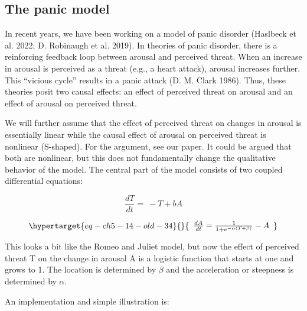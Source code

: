 \documentclass[
  letterpaper,
]{scrbook}
\begin{document}
\hypertarget{the-panic-model}{%
\subsection{The panic model}\label{the-panic-model}}

In recent years, we have been working on a model of panic disorder
(Haslbeck et al. 2022; D. Robinaugh et al. 2019). In theories of panic
disorder, there is a reinforcing feedback loop between arousal and
perceived threat. When an increase in arousal is perceived as a threat
(e.g., a heart attack), arousal increases further. This ``vicious
cycle'' results in a panic attack (D. M. Clark 1986). Thus, these
theories posit two causal effects: an effect of perceived threat on
arousal and an effect of arousal on perceived threat.

We will further assume that the effect of perceived threat on changes in
arousal is essentially linear while the causal effect of arousal on
perceived threat is nonlinear (S-shaped). For the argument, see our
paper. It could be argued that both are nonlinear, but this does not
fundamentally change the qualitative behavior of the model. The central
part of the model consists of two coupled differential equations:

\[\frac{dT}{dt} = \  - T + bA\]

\begin{equation}\protect\hypertarget{eq-ch5-14-old-34}{}{\begin{array}{r}
\frac{dA}{dt} = \frac{1}{1 + e^{- \alpha(T + \beta)}} - A
\end{array}}\label{eq-ch5-14-old-34}\end{equation}

This looks a bit like the Romeo and Juliet model, but now the effect of
perceived threat T on the change in arousal A is a logistic function
that starts at one and grows to 1. The location is determined by
\(\beta\) and the acceleration or steepness is determined by \(\alpha\).

An implementation and simple illustration is:
\end{document}
